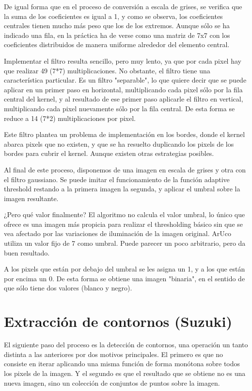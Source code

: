 \documentclass[10pt,a4paper]{article}
\begin{document}
\begin{equation}
[0.03125, 0.109375, 0.21875, 0.28125, 0.21875, 0.109375, 0.03125]
\end{equation}

De igual forma que en el proceso de conversión a escala de grises, se verifica que la suma de los coeficientes es igual a 1, y como se observa, los coeficientes centrales tienen mucho más peso que los de los extremos. Aunque sólo se ha indicado una fila, en la práctica ha de verse como una matriz de 7x7 con los coeficientes distribuidos de manera uniforme alrededor del elemento central. 

Implementar el filtro resulta sencillo, pero muy lento, ya que por cada pixel hay que realizar 49 (7*7) multiplicaciones. No obstante, el filtro tiene una característica particular. Es un filtro "separable", lo que quiere decir que se puede aplicar en un primer paso en horizontal, multiplicando cada pixel sólo por la fila central del kernel, y al resultado de ese primer paso aplicarle el filtro en vertical, multiplicando cada pixel nuevamente sólo por la fila central. De esta forma se reduce a 14 (7*2) multiplicaciones por pixel. 

Este filtro plantea un problema de implementación en los bordes, donde el kernel abarca pixels que no existen, y que se ha resuelto duplicando los pixels de los bordes para cubrir el kernel. Aunque existen otras estrategias posibles.

Al final de este proceso, disponemos de una imagen en escala de grises y otra con el filtro gaussiano. Se puede imitar el funcionamiento de la función adaptive threshold restando a la primera imagen la segunda, y aplicar el umbral sobre la imagen resultante.

¿Pero qué valor finalmente? El algoritmo no calcula el valor umbral, lo único que ofrece es una imagen más propicia para realizar el thresholding básico sin que se vea afectado por las variaciones de iluminación de la imagen original. ArUco utiliza un valor fijo de 7 como umbral. Puede parecer un poco arbitrario, pero da buen resultado.

A los pixels que están por debajo del umbral se les asigna un 1, y a los que están por encima un 0. De esta forma se obtiene una imagen "binaria", en el sentido de que sólo tiene dos valores (blanco y negro).

\section{Extracción de contornos (Suzuki)}
El siguiente paso del proceso es la detección de contornos, una operación un tanto distinta a las anteriores por dos motivos principales. El primero es que no consiste en iterar aplicando una misma función de forma monótona sobre todos los pixels de la imagen. Y el segundo es que el resultado que se obtiene no es una nueva imagen, sino un colección de conjuntos de puntos sobre la imagen.
\end{document}
